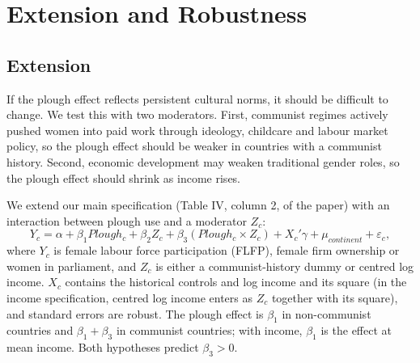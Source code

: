 \documentclass[12pt,a4paper]{article}
\begin{document}
\section{Extension and Robustness}
\subsection{Extension}

If the plough effect reflects persistent cultural norms, it should be difficult to change. We test this with two moderators. First, communist regimes actively pushed women into paid work through ideology, childcare and labour market policy, so the plough effect should be weaker in countries with a communist history. Second, economic development may weaken traditional gender roles, so the plough effect should shrink as income rises.

We extend our main specification (Table IV, column 2, of the paper) with an interaction between plough use and a moderator $Z_c$:
\begin{equation}
    Y_c = \alpha + \beta_1 Plough_c + \beta_2 Z_c + \beta_3 (Plough_c \times Z_c) + X_c'\gamma + \mu_{continent} + \varepsilon_c ,
    \label{eq:extension}
\end{equation}
where $Y_c$ is female labour force participation (FLFP), female firm ownership or women in parliament, and $Z_c$ is either a communist-history dummy or centred log income. $X_c$ contains the historical controls and log income and its square (in the income specification, centred log income enters as $Z_c$ together with its square), and standard errors are robust. The plough effect is $\beta_1$ in non-communist countries and $\beta_1+\beta_3$ in communist countries; with income, $\beta_1$ is the effect at mean income. Both hypotheses predict $\beta_3 > 0$.
\end{document}
